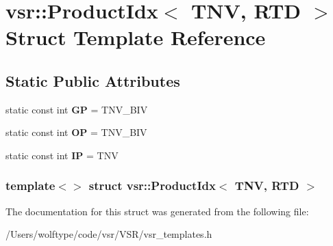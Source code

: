 \hypertarget{structvsr_1_1_product_idx_3_01_t_n_v_00_01_r_t_d_01_4}{\section{vsr\-:\-:Product\-Idx$<$ T\-N\-V, R\-T\-D $>$ Struct Template Reference}
\label{structvsr_1_1_product_idx_3_01_t_n_v_00_01_r_t_d_01_4}
}
\subsection*{Static Public Attributes}
\begin{DoxyCompactItemize}
\item 
\hypertarget{structvsr_1_1_product_idx_3_01_t_n_v_00_01_r_t_d_01_4_a3df9511faef800157cc50e950eec8711}{static const int {\bfseries G\-P} = T\-N\-V\-\_\-\-B\-I\-V}\label{structvsr_1_1_product_idx_3_01_t_n_v_00_01_r_t_d_01_4_a3df9511faef800157cc50e950eec8711}

\item 
\hypertarget{structvsr_1_1_product_idx_3_01_t_n_v_00_01_r_t_d_01_4_ab7cb223a0b4d01d4968a6700a5044a87}{static const int {\bfseries O\-P} = T\-N\-V\-\_\-\-B\-I\-V}\label{structvsr_1_1_product_idx_3_01_t_n_v_00_01_r_t_d_01_4_ab7cb223a0b4d01d4968a6700a5044a87}

\item 
\hypertarget{structvsr_1_1_product_idx_3_01_t_n_v_00_01_r_t_d_01_4_ac8c1b72fa3f6411fb5a7478ef889ff42}{static const int {\bfseries I\-P} = T\-N\-V}\label{structvsr_1_1_product_idx_3_01_t_n_v_00_01_r_t_d_01_4_ac8c1b72fa3f6411fb5a7478ef889ff42}

\end{DoxyCompactItemize}
\subsubsection*{template$<$$>$ struct vsr\-::\-Product\-Idx$<$ T\-N\-V, R\-T\-D $>$}



The documentation for this struct was generated from the following file\-:\begin{DoxyCompactItemize}
\item 
/\-Users/wolftype/code/vsr/\-V\-S\-R/vsr\-\_\-templates.\-h\end{DoxyCompactItemize}
